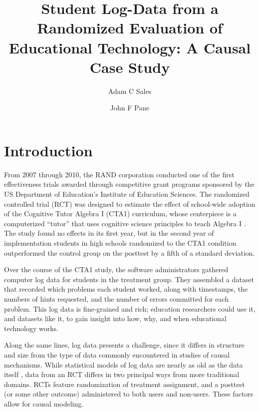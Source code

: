 \documentclass{article}\usepackage[]{graphicx}\usepackage[]{color}
\title{Student Log-Data from a Randomized Evaluation of Educational
  Technology: A Causal Case Study}
\author[1]{Adam C Sales}
\author[2]{John F Pane}
\affil[1]{University of Texas, Austin, TX}
\affil[2]{RAND Corporation, Pittsburgh, PA}
\begin{document}
\maketitle

\section{Introduction}
From 2007 through 2010, the RAND corporation
conducted one of the first effectiveness trials awarded through
competitive grant programs sponsored by the US Department of
Education's Institute of Education Sciences.  The randomized
controlled trial (RCT) was
designed to estimate the effect of school-wide adoption of the
Cognitive Tutor Algebra I (CTA1) curriculum, whose centerpiece is a
computerized ``tutor'' that uses cognitive science principles to teach
Algebra I \citep{anderson1985intelligent}.
The study \citep{pane2014effectiveness} found no effects in its first year, but in
the second year of implementation students in high schools randomized to
the CTA1 condition outperformed the control group on the posttest by a fifth of a
standard deviation.

Over the course of the CTA1 study, the software administrators
gathered computer log data for students in the treatment group.
They assembled a dataset that recorded which problems each student
worked, along with timestamps, the numbers of hints requested, and the
number of errors committed for each problem.
This log data is fine-grained and rich;
education researchers could use it, and datasets like it,
to gain insight into how, why, and when educational technology works.

Along the same lines, log data presents a challenge, since it differs in
structure and size from the type of data commonly encountered in
studies of causal mechanisms.
While statistical models of log data are nearly as old as the data itself
\citep[e.g.][]{corbett1994knowledge}, data from an RCT differs in
two principal ways from more traditional domains.
RCTs feature randomization of treatment assignment, and a posttest
(or some other outcome) administered to both users and non-users.
These factors allow for causal modeling.
\end{document}
